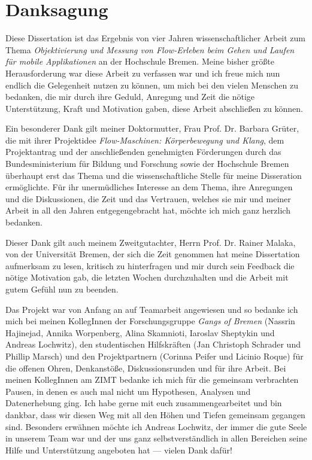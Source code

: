 \section*{Danksagung}

Diese Dissertation ist das Ergebnis von vier Jahren wissenschaftlicher Arbeit zum Thema \emph{Objektivierung und Messung von Flow-Erleben beim Gehen und Laufen für mobile Applikationen} an der Hochschule Bremen. Meine bisher größte Herausforderung war diese Arbeit zu verfassen war  und ich freue mich nun endlich die Gelegenheit nutzen zu können, um mich bei den vielen Menschen zu bedanken, die mir durch ihre Geduld, Anregung und Zeit die nötige Unterstützung, Kraft und Motivation gaben, diese Arbeit abschließen zu können.

Ein besonderer Dank gilt meiner Doktormutter, Frau Prof. Dr. Barbara Grüter, die mit ihrer Projektidee \emph{Flow-Maschinen: Körperbewegung und Klang}, dem Projektantrag und der anschließenden genehmigten Förderungen durch das Bundesministerium für Bildung und Forschung sowie der Hochschule Bremen überhaupt erst das Thema und die wissenschaftliche Stelle für meine Disseration ermöglichte. Für ihr unermüdliches Interesse an dem Thema, ihre Anregungen und die Diskussionen, die Zeit und das Vertrauen, welches sie mir und meiner Arbeit in all den Jahren entgegengebracht hat, möchte ich mich ganz herzlich bedanken.

Dieser Dank gilt auch meinem Zweitgutachter, Herrn Prof. Dr. Rainer Malaka, von der Universität Bremen, der sich die Zeit genommen hat meine Dissertation aufmerksam zu lesen, kritisch zu hinterfragen und mir durch sein Feedback die nötige Motivation gab, die letzten Wochen durchzuhalten und die Arbeit mit gutem Gefühl nun zu beenden.

Das Projekt war von Anfang an auf Teamarbeit angewiesen und so bedanke ich mich bei meinen KollegInnen der Forschungsgruppe \emph{Gangs of Bremen} (Nassrin Hajinejad, Annika Worpenberg, Alina Skamnioti, Iaroslav Sheptykin und Andreas Lochwitz), den studentischen Hilfskräften (Jan Christoph Schrader und Phillip Marsch) und den Projektpartnern (Corinna Peifer und Licinio Roque) für die offenen Ohren, Denkanstöße, Diskussionsrunden und für ihre Arbeit. Bei meinen KollegInnen am ZIMT bedanke ich mich für die gemeinsam verbrachten Pausen, in denen es auch mal nicht um Hypothesen, Analysen und Datenerhebung ging. Ich habe gerne mit euch zusammengearbeitet und bin dankbar, dass wir diesen Weg mit all den Höhen und Tiefen gemeinsam gegangen sind. Besonders erwähnen möchte ich Andreas Lochwitz, der immer die gute Seele in unserem Team war und der uns ganz selbstverständlich in allen Bereichen seine Hilfe und Unterstützung angeboten hat --- vielen Dank dafür! 

